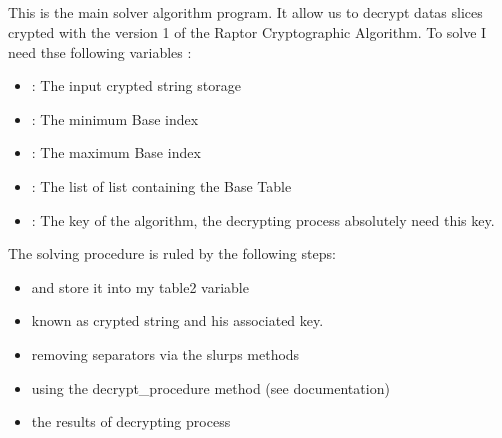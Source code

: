 \documentclass[letterpaper,10pt,english]{sphinxmanual}
\begin{document}
\subsection{}
\label{\detokenize{DescriptionofDecrypterv3:algorithm}}
\sphinxAtStartPar
This is the main solver algorithm program.
It allow us to decrypt datas slices crypted with the version 1 of the Raptor Cryptographic Algorithm.
To solve I need thse following variables :
\begin{itemize}
\item {} 
\sphinxAtStartPar
{} : The input crypted string storage

\item {} 
\sphinxAtStartPar
{} : The minimum Base index

\item {} 
\sphinxAtStartPar
{} : The maximum Base index

\item {} 
\sphinxAtStartPar
{} : The list of list containing the Base Table

\item {} 
\sphinxAtStartPar
{} : The key of the algorithm, the decrypting process absolutely need this key.

\end{itemize}

\sphinxAtStartPar
The solving procedure is ruled by the following steps:
\begin{itemize}
\item {} 
\sphinxAtStartPar
{} and store it into my table2 variable

\item {} 
\sphinxAtStartPar
{} known as crypted string and his associated key.

\item {} 
\sphinxAtStartPar
{} removing separators via the slurps methods

\item {} 
\sphinxAtStartPar
{} using the decrypt\_procedure method (see documentation)

\item {} 
\sphinxAtStartPar
{} the results of decrypting process

\end{itemize}
\end{document}
